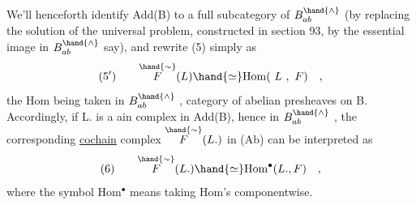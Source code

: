 
We'll henceforth identify Add(B) to a full subcategory of $B^{\hand{\wedge}}_{ab}$
(by replacing the solution of the universal problem, constructed in
section 93, by the essential  image in $B^{\hand{\wedge}}_{ab}$ say), and rewrite (5)
simply as
\[ (5') \qquad \overset{\hand{\sim}}{F}(L)\hand{\simeq} \mathrm{Hom}(\ L\ ,\ F) \quad , \]
the Hom being taken in $B^{\hand{\wedge}}_{ab}$ , category of abelian presheaves on B.
Accordingly, if L. is a ain complex in Add(B), hence in $B^{\hand{\wedge}}_{ab}$ ,
the corresponding \uline{cochain} complex $\overset{\hand{\sim}}{F}(L.)$ in (Ab) can be interpreted as
\[ (6) \qquad \overset{\hand{\sim}}{F}(L.)\hand{\simeq} \mathrm{Hom}^{\bullet}(L.,F) \quad , \]
where  the symbol Hom$^{\bullet}$ means taking Hom's componentwise.

